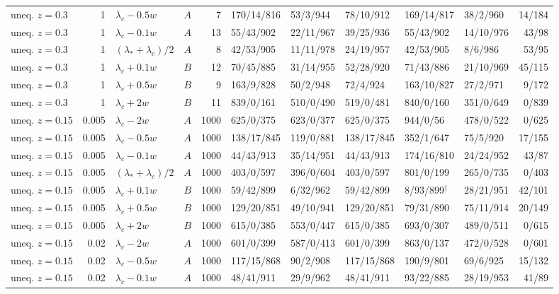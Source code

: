 \begin{longtable}{@{}lrllrlllllr@{}}
uneq. $z{=}0.3$ & 1 & $\lambda_c-0.5w$ & $A$ & 7 & 170/14/816 & 53/3/944 & 78/10/912 & 169/14/817 & 38/2/960 & 14/184\\
uneq. $z{=}0.3$ & 1 & $\lambda_c-0.1w$ & $A$ & 13 & 55/43/902 & 22/11/967 & 39/25/936 & 55/43/902 & 14/10/976 & 43/98\\
uneq. $z{=}0.3$ & 1 & $(\lambda_*+\lambda_c)/2$ & $A$ & 8 & 42/53/905 & 11/11/978 & 24/19/957 & 42/53/905 & 8/6/986 & 53/95\\
uneq. $z{=}0.3$ & 1 & $\lambda_c+0.1w$ & $B$ & 12 & 70/45/885 & 31/14/955 & 52/28/920 & 71/43/886 & 21/10/969 & 45/115\\
uneq. $z{=}0.3$ & 1 & $\lambda_c+0.5w$ & $B$ & 9 & 163/9/828 & 50/2/948 & 72/4/924 & 163/10/827 & 27/2/971 & 9/172\\
uneq. $z{=}0.3$ & 1 & $\lambda_c+2w$ & $B$ & 11 & 839/0/161 & 510/0/490 & 519/0/481 & 840/0/160 & 351/0/649 & 0/839\\
uneq. $z{=}0.15$ & 0.005 & $\lambda_c-2w$ & $A$ & 1000 & 625/0/375 & 623/0/377 & 625/0/375 & 944/0/56 & 478/0/522 & 0/625\\
uneq. $z{=}0.15$ & 0.005 & $\lambda_c-0.5w$ & $A$ & 1000 & 138/17/845 & 119/0/881 & 138/17/845 & 352/1/647 & 75/5/920 & 17/155\\
uneq. $z{=}0.15$ & 0.005 & $\lambda_c-0.1w$ & $A$ & 1000 & 44/43/913 & 35/14/951 & 44/43/913 & 174/16/810 & 24/24/952 & 43/87\\
uneq. $z{=}0.15$ & 0.005 & $(\lambda_*+\lambda_c)/2$ & $A$ & 1000 & 403/0/597 & 396/0/604 & 403/0/597 & 801/0/199 & 265/0/735 & 0/403\\
uneq. $z{=}0.15$ & 0.005 & $\lambda_c+0.1w$ & $B$ & 1000 & 59/42/899 & 6/32/962 & 59/42/899 & 8/93/899$^\dagger$ & 28/21/951 & 42/101\\
uneq. $z{=}0.15$ & 0.005 & $\lambda_c+0.5w$ & $B$ & 1000 & 129/20/851 & 49/10/941 & 129/20/851 & 79/31/890 & 75/11/914 & 20/149\\
uneq. $z{=}0.15$ & 0.005 & $\lambda_c+2w$ & $B$ & 1000 & 615/0/385 & 553/0/447 & 615/0/385 & 693/0/307 & 489/0/511 & 0/615\\
uneq. $z{=}0.15$ & 0.02 & $\lambda_c-2w$ & $A$ & 1000 & 601/0/399 & 587/0/413 & 601/0/399 & 863/0/137 & 472/0/528 & 0/601\\
uneq. $z{=}0.15$ & 0.02 & $\lambda_c-0.5w$ & $A$ & 1000 & 117/15/868 & 90/2/908 & 117/15/868 & 190/9/801 & 69/6/925 & 15/132\\
uneq. $z{=}0.15$ & 0.02 & $\lambda_c-0.1w$ & $A$ & 1000 & 48/41/911 & 29/9/962 & 48/41/911 & 93/22/885 & 28/19/953 & 41/89\\

\end{longtable}
